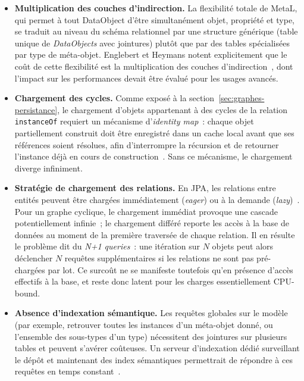 \begin{itemize}
    \item \textbf{Multiplication des couches d'indirection.} La flexibilité totale de MetaL, qui permet à tout DataObject d'être simultanément objet, propriété et type, se traduit au niveau du schéma relationnel par une structure générique (table unique de \textit{DataObjects} avec jointures) plutôt que par des tables spécialisées par type de méta-objet. Englebert et Heymans notent explicitement que le coût de cette flexibilité est la multiplication des couches d'indirection~\cite{Eng2007}, dont l'impact sur les performances devait être évalué pour les usages avancés.

    \item \textbf{Chargement des cycles.} Comme exposé à la section~\ref{sec:graphes-persistance}, le chargement d'objets appartenant à des cycles de la relation \texttt{instanceOf} requiert un mécanisme d'\textit{identity map}~: chaque objet partiellement construit doit être enregistré dans un cache local avant que ses références soient résolues, afin d'interrompre la récursion et de retourner l'instance déjà en cours de construction~\cite{jpa2013}. Sans ce mécanisme, le chargement diverge infiniment.

    \item \textbf{Stratégie de chargement des relations.} En JPA, les relations entre entités peuvent être chargées immédiatement (\textit{eager}) ou à la demande (\textit{lazy})~\cite{jpa2013}. Pour un graphe cyclique, le chargement immédiat provoque une cascade potentiellement infinie~; le chargement différé reporte les accès à la base de données au moment de la première traversée de chaque relation. Il en résulte le problème dit du \textit{N+1 queries}~: une itération sur $N$ objets peut alors déclencher $N$ requêtes supplémentaires si les relations ne sont pas pré-chargées par lot. Ce surcoût ne se manifeste toutefois qu'en présence d'accès effectifs à la base, et reste donc latent pour les charges essentiellement CPU-bound.

    \item \textbf{Absence d'indexation sémantique.} Les requêtes globales sur le modèle (par exemple, retrouver toutes les instances d'un méta-objet donné, ou l'ensemble des sous-types d'un type) nécessitent des jointures sur plusieurs tables et peuvent s'avérer coûteuses. Un serveur d'indexation dédié surveillant le dépôt et maintenant des index sémantiques permettrait de répondre à ces requêtes en temps constant~\cite{kolovos2013research}.
\end{itemize}

